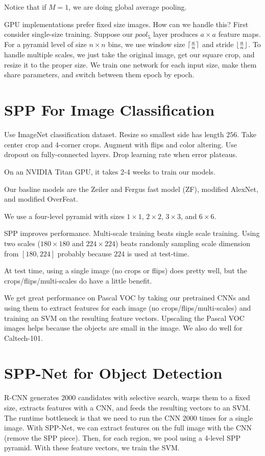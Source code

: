 \documentclass[a4paper]{article}
\DeclarePairedDelimiter{\ceil}{\lceil}{\rceil}
\DeclarePairedDelimiter{\floor}{\lfloor}{\rfloor}
\begin{document}
Notice that if $M = 1$, we are doing global average pooling.

GPU implementations prefer fixed size images. How can we handle this? First
consider single-size training. Suppose our $pool_5$ layer produces $a \times
a$ feature maps. For a pyramid level of size $n \times n$ bins, we use
window size $\ceil{\frac{a}{n}}$ and stride $\floor{\frac{a}{n}}$. To
handle multiple scales, we just take the original image, get our square crop,
and resize it to the proper size. We train one network for each input size,
make them share parameters, and switch between them epoch by epoch.

\section{SPP For Image Classification}
Use ImageNet classification dataset. Resize so smallest side has length $256$.
Take center crop and 4-corner crops. Augment with flips and color altering. Use
dropout on fully-connected layers. Drop learning rate when error plateaus.

On an NVIDIA Titan GPU, it takes 2-4 weeks to train our models.

Our basline models are the Zeiler and Fergus fast model (ZF), modified AlexNet,
and modified OverFeat.

We use a four-level pyramid with sizes $1 \times 1$, $2 \times 2$, $3 \times 3$,
and $6 \times 6$.

SPP improves performance. Multi-scale training beats single scale training.
Using two scales ($180 \times 180$ and $224 \times 224$) beats randomly sampling
scale dimension from $[180, 224]$ probably because $224$ is used at test-time.

At test time, using a single image (no crops or flips) does pretty well, but the
crops/flips/multi-scales do have a little benefit.

We get great performance on Pascal VOC by taking our pretrained CNNs and using
them to extract features for each image (no crops/flips/multi-scales) and
training an SVM on the resulting feature vectors. Upscaling the Pascal VOC
images helps because the objects are small in the image. We also do well
for Caltech-101.

\section{SPP-Net for Object Detection}
R-CNN generates 2000 candidates with selective search, warps them to a fixed
size, extracts features with a CNN, and feeds the resulting vectors to an SVM.
The runtime bottleneck is that we need to run the CNN 2000 times for a single
image. With SPP-Net, we can extract features on the full image with the CNN
(remove the SPP piece). Then, for each region, we pool using a 4-level
SPP pyramid. With these feature vectors, we train the SVM.
\end{document}
